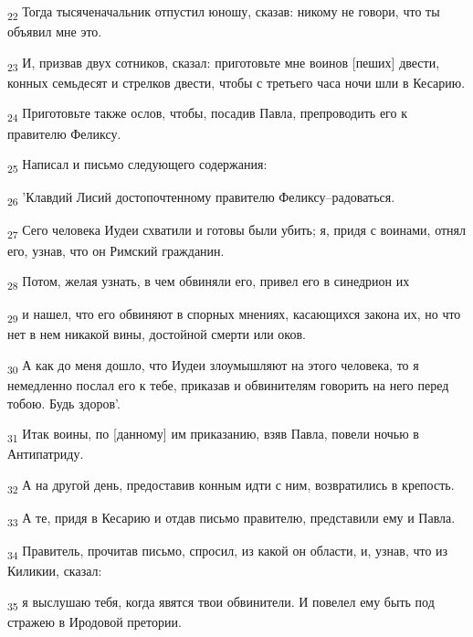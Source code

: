 \begin{tcolorbox}
\textsubscript{22} Тогда тысяченачальник отпустил юношу, сказав: никому не говори, что ты объявил мне это.
\end{tcolorbox}
\begin{tcolorbox}
\textsubscript{23} И, призвав двух сотников, сказал: приготовьте мне воинов [пеших] двести, конных семьдесят и стрелков двести, чтобы с третьего часа ночи шли в Кесарию.
\end{tcolorbox}
\begin{tcolorbox}
\textsubscript{24} Приготовьте также ослов, чтобы, посадив Павла, препроводить его к правителю Феликсу.
\end{tcolorbox}
\begin{tcolorbox}
\textsubscript{25} Написал и письмо следующего содержания:
\end{tcolorbox}
\begin{tcolorbox}
\textsubscript{26} 'Клавдий Лисий достопочтенному правителю Феликсу--радоваться.
\end{tcolorbox}
\begin{tcolorbox}
\textsubscript{27} Сего человека Иудеи схватили и готовы были убить; я, придя с воинами, отнял его, узнав, что он Римский гражданин.
\end{tcolorbox}
\begin{tcolorbox}
\textsubscript{28} Потом, желая узнать, в чем обвиняли его, привел его в синедрион их
\end{tcolorbox}
\begin{tcolorbox}
\textsubscript{29} и нашел, что его обвиняют в спорных мнениях, касающихся закона их, но что нет в нем никакой вины, достойной смерти или оков.
\end{tcolorbox}
\begin{tcolorbox}
\textsubscript{30} А как до меня дошло, что Иудеи злоумышляют на этого человека, то я немедленно послал его к тебе, приказав и обвинителям говорить на него перед тобою. Будь здоров'.
\end{tcolorbox}
\begin{tcolorbox}
\textsubscript{31} Итак воины, по [данному] им приказанию, взяв Павла, повели ночью в Антипатриду.
\end{tcolorbox}
\begin{tcolorbox}
\textsubscript{32} А на другой день, предоставив конным идти с ним, возвратились в крепость.
\end{tcolorbox}
\begin{tcolorbox}
\textsubscript{33} А те, придя в Кесарию и отдав письмо правителю, представили ему и Павла.
\end{tcolorbox}
\begin{tcolorbox}
\textsubscript{34} Правитель, прочитав письмо, спросил, из какой он области, и, узнав, что из Киликии, сказал:
\end{tcolorbox}
\begin{tcolorbox}
\textsubscript{35} я выслушаю тебя, когда явятся твои обвинители. И повелел ему быть под стражею в Иродовой претории.
\end{tcolorbox}
